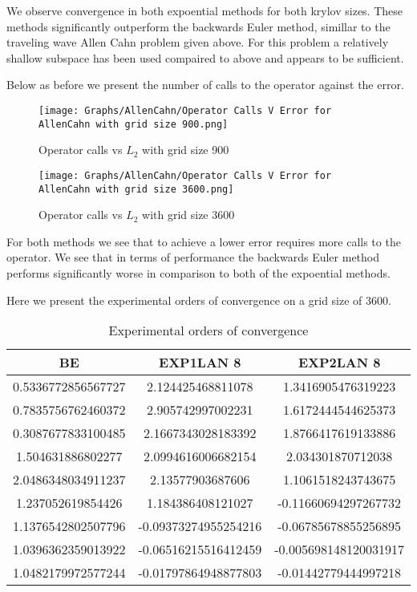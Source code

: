 We observe convergence in both expoential methods for both krylov sizes.
These methods significantly outperform the backwards Euler method, simillar to the traveling wave Allen Cahn problem given above.
For this problem a relatively shallow subspace has been used compaired to above and appears to be sufficient.

Below as before we present the number of calls to the operator against the error.
\begin{figure}[H]
    \centering
    \begin{minipage}{0.49\textwidth}
        \texttt{[image: Graphs/AllenCahn/Operator Calls V Error for AllenCahn with grid size 900.png]} %
        \caption{Operator calls vs $L_2$ with grid size 900}
        \label{fig:plot1}
    \end{minipage}\hfill
    \centering
    \begin{minipage}{0.49\textwidth}
        \texttt{[image: Graphs/AllenCahn/Operator Calls V Error for AllenCahn with grid size 3600.png]} %
        \caption{Operator calls vs $L_2$ with grid size 3600}
        \label{fig:plot2}
    \end{minipage}\hfill
\end{figure}
For both methods we see that to achieve a lower error requires more calls to the operator.
We see that in terms of performance the backwards Euler method performs significantly worse in comparison to both of the expoential methods.

Here we present the experimental orders of convergence on a grid size of 3600.

\begin{table}[H]
    \centering
    \begin{tabular}{| c | c | c |}
    \hline
    BE & EXP1LAN 8 & EXP2LAN 8 \\
    \hline
    0.5336772856567727 & 2.124425468811078    & 1.3416905476319223 \\
    0.7835756762460372 & 2.905742997002231    & 1.6172444544625373 \\
    0.3087677833100485 & 2.1667343028183392   & 1.8766417619133886 \\
    1.504631886802277  & 2.0994616006682154   & 2.034301870712038 \\
    2.0486348034911237 & 2.13577903687606     & 1.1061518243743675 \\
    1.237052619854426  & 1.184386408121027    & -0.11660694297267732 \\
    1.1376542802507796 & -0.09373274955254216 & -0.06785678855256895 \\
    1.0396362359013922 & -0.06516215516412459 & -0.005698148120031917 \\
    1.0482179972577244 & -0.01797864948877803 & -0.01442779444997218 \\
    \hline
    \end{tabular}
    \caption{Experimental orders of convergence}
    \label{tab:reduced_data}
\end{table}

